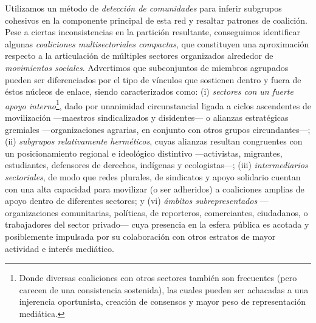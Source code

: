 \documentclass[letterpaper, 11pt]{book}
\theoremstyle{definition}
\theoremstyle{remark}
\begin{document}
Utilizamos un método de \emph{detección de comunidades} para inferir subgrupos cohesivos en la componente principal de esta red y resaltar patrones de coalición. 
Pese a ciertas inconsistencias en la partición resultante, conseguimos identificar algunas \emph{coaliciones multisectoriales compactas}, que constituyen una aproximación respecto a la articulación de múltiples sectores organizados alrededor de \emph{movimientos sociales}. 
Advertimos que subconjuntos de miembros agrupados pueden ser diferenciados por el tipo de vínculos que sostienen dentro y fuera de éstos núcleos de enlace, siendo caracterizados como: 
(i) \emph{sectores con un fuerte apoyo interno}\footnote{
    Donde diversas coaliciones con otros sectores también son frecuentes (pero carecen de una consistencia sostenida), las cuales pueden ser achacadas a una injerencia oportunista, creación de consensos y mayor peso de representación mediática.
}, dado por unanimidad circunstancial ligada a ciclos ascendentes de movilización ---maestros sindicalizados y disidentes--- o alianzas estratégicas gremiales ---organizaciones agrarias, en conjunto con otros grupos circundantes---; 
(ii) \emph{subgrupos relativamente herméticos}, cuyas alianzas resultan congruentes con un posicionamiento regional e ideológico distintivo ---activistas, migrantes, estudiantes, defensores de derechos, indígenas y ecologistas---; 
(iii) \emph{intermediarios sectoriales}, de modo que redes plurales, de sindicatos y apoyo solidario cuentan con una alta capacidad para movilizar (o ser adheridos) a coaliciones amplias de apoyo dentro de diferentes sectores; 
y (vi) \emph{ámbitos subrepresentados} ---organizaciones comunitarias, políticas, de reporteros, comerciantes, ciudadanos, o trabajadores del sector privado--- cuya presencia en la esfera pública es acotada y posiblemente impulsada por su colaboración con otros estratos de mayor actividad e interés mediático. 
\end{document}
